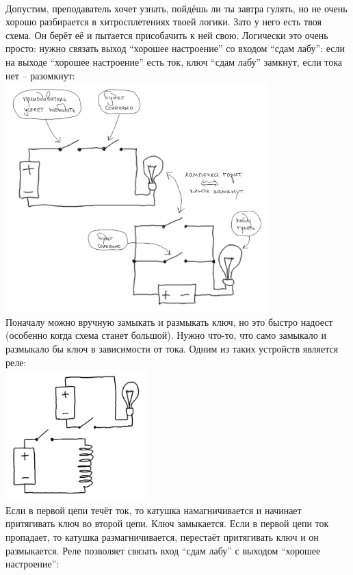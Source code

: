 \documentclass[11pt]{book}
\begin{document}
\\
Допустим, преподаватель хочет узнать, пойдёшь ли ты завтра гулять, но не очень
хорошо разбирается в хитросплетениях твоей логики. Зато у него есть твоя схема.
Он берёт её и пытается присобачить к ней свою. Логически это очень просто:
нужно связать выход ``хорошее настроение'' со входом ``сдам лабу'': если на выходе
``хорошее настроение'' есть ток, ключ ``сдам лабу'' замкнут, если тока нет --
разомкнут:
\\
\includegraphics[height=3.5in]{pic/10.png}
\\
Поначалу можно вручную замыкать и размыкать ключ, но это быстро надоест
(особенно когда схема станет большой). Нужно что-то, что само замыкало и
размыкало бы ключ в зависимости от тока. Одним из таких устройств является
реле:
\\
\includegraphics[height=2in]{pic/11.png}
\\
Если в первой цепи течёт ток, то катушка намагничивается и начинает притягивать
ключ во второй цепи. Ключ замыкается. Если в первой цепи ток пропадает, то катушка размагничивается,
перестаёт притягивать ключ и он размыкается. Реле позволяет связать вход
``сдам лабу'' с выходом ``хорошее настроение'':
\\
\end{document}
